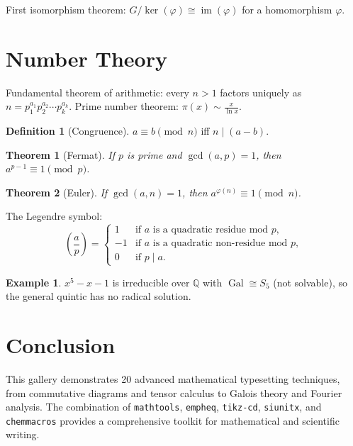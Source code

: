 \documentclass[
    language=english,
    doctype=article,
    institution=none,
    titlestyle=book,
]{../../omnilatex}
\DeclareMathOperator{\Gal}{Gal}
\DeclareMathOperator{\im}{im}
\DeclareMathOperator{\ker}{ker}
\theoremstyle{plain}
\newtheorem{theorem}{Theorem}[section]
\theoremstyle{definition}
\newtheorem{definition}{Definition}[section]
\newtheorem{example}{Example}[section]
\theoremstyle{remark}
\begin{document}
First isomorphism theorem: $G / \ker(\varphi) \cong \im(\varphi)$ for a homomorphism $\varphi$.

\section{Number Theory}
\label{sec:number-theory}

Fundamental theorem of arithmetic: every $n > 1$ factors uniquely as
$n = p_1^{a_1} p_2^{a_2} \cdots p_k^{a_k}$. Prime number theorem: $\pi(x) \sim \frac{x}{\ln x}$.

\begin{definition}[Congruence]\label{def:congruence}
$a \equiv b \pmod{n}$ iff $n \mid (a - b)$.
\end{definition}

\begin{theorem}[Fermat]\label{thm:fermat}
If $p$ is prime and $\gcd(a, p) = 1$, then $a^{p-1} \equiv 1 \pmod{p}$.
\end{theorem}

\begin{theorem}[Euler]\label{thm:euler}
If $\gcd(a, n) = 1$, then $a^{\varphi(n)} \equiv 1 \pmod{n}$.
\end{theorem}

The Legendre symbol:
\[
    \left(\frac{a}{p}\right) = \begin{cases}
        1 & \text{if } a \text{ is a quadratic residue mod } p, \\
        -1 & \text{if } a \text{ is a quadratic non-residue mod } p, \\
        0 & \text{if } p \mid a.
    \end{cases}
\]

\begin{example}
$x^5 - x - 1$ is irreducible over $\mathbb{Q}$ with $\Gal \cong S_5$ (not solvable),
so the general quintic has no radical solution.
\end{example}

\section{Conclusion}
\label{sec:conclusion}

This gallery demonstrates 20 advanced mathematical typesetting techniques, from
commutative diagrams and tensor calculus to Galois theory and Fourier analysis.
The combination of \texttt{mathtools}, \texttt{empheq}, \texttt{tikz-cd},
\texttt{siunitx}, and \texttt{chemmacros} provides a comprehensive toolkit
for mathematical and scientific writing.
\end{document}
